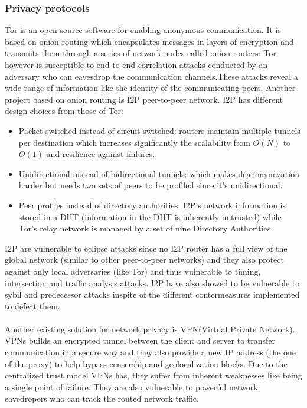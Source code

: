 \subsubsection{Privacy protocols}
Tor is an open-source software for enabling anonymous communication. It is based on onion routing which encapsulates messages in layers of encryption and transmits them through a series of network nodes called onion routers. Tor however is susceptible to end-to-end correlation attacks conducted by an adversary who can eavesdrop the communication channels.These attacks reveal a wide range of information like the identity of the communicating peers.
Another project based on onion routing is I2P peer-to-peer network. I2P has different design choices from those of Tor:
\begin{itemize}
    \item Packet switched instead of circuit switched: routers maintain multiple tunnels per destination which increases significantly the scalability from $O(N)$ to $O(1)$ and resilience against failures.
    \item Unidirectional instead of bidirectional tunnels: which makes deanonymization harder but needs two sets of peers to be profiled since it's unidirectional.
    \item Peer profiles instead of directory authorities: I2P’s network information is stored in a DHT (information in the DHT is inherently untrusted) while Tor’s relay network is managed by a set of nine Directory Authorities.

\end{itemize}
I2P are vulnerable to eclipse attacks since no I2P router has a full view of the global network (similar to other peer-to-peer networks) and they also protect against only local adversaries (like Tor) and thus vulnerable to timing, intersection and traffic analysis attacks. I2P have also showed to be vulnerable to sybil and predecessor attacks inspite of the different contermeasures implemented to defeat them.
\\~\\Another existing solution for network privacy is VPN(Virtual Private Network). 
VPNs builds an encrypted tunnel between the client and server to transfer communication in a secure way and they also provide a new IP address (the one of the proxy) to help bypass censership and geolocalization blocks.
Due to the centralized trust model VPNs has, they suffer from inherent weaknesses like being a single point of failure. They are also vulnerable to powerful network eavedropers who can track the routed network traffic.
